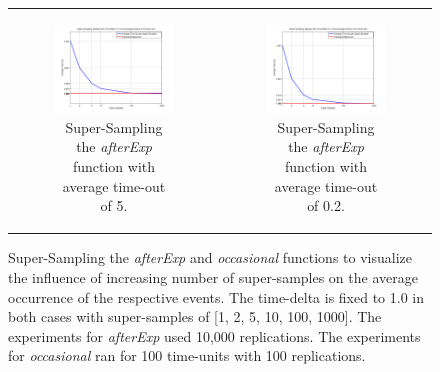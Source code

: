 \begin{figure}
\begin{center}
\begin{tabular}{c c}
		\begin{subfigure}[b]{0.5\textwidth}
			\centering
			\includegraphics[width=.6\textwidth, angle=0]{./../shared/fig/samplingTest_afterExp_SS_5time.png}
			\caption{Super-Sampling the \textit{afterExp} function with average time-out of 5.}
			\label{fig:sampling_afterExp_ss_5time}
		\end{subfigure}

		&
		
		\begin{subfigure}[b]{0.5\textwidth}
			\centering
			\includegraphics[width=.6\textwidth, angle=0]{./../shared/fig/samplingTest_afterExp_SS_02time.png}
			\caption{Super-Sampling the \textit{afterExp} function with average time-out of 0.2.}
			\label{fig:sampling_afterExp_ss_02time}
		\end{subfigure}
	\end{tabular}
	
	\caption{Super-Sampling the \textit{afterExp} and \textit{occasional} functions to visualize the influence of increasing number of super-samples on the average occurrence of the respective events. The time-delta is fixed to 1.0 in both cases with super-samples of [1, 2, 5, 10, 100, 1000]. The experiments for \textit{afterExp} used 10,000 replications. The experiments for \textit{occasional} ran for 100 time-units with 100 replications.} 
	\label{fig:supersampling_tests}
\end{center}
\end{figure}

